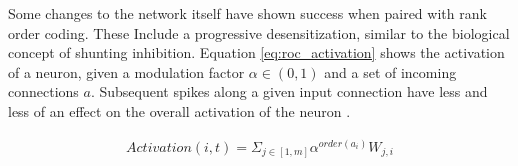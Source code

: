     Some changes to the network itself have shown success when paired with rank
    order coding. These Include a progressive desensitization, similar to the
    biological concept of shunting inhibition. Equation \ref{eq:roc_activation}
    shows the activation of a neuron, given a modulation factor $\alpha \in
    (0,1)$ and a set of incoming connections $a$. Subsequent spikes along a
    given input connection have less and less of an effect on the overall
    activation of the neuron \cite{delorme_2001}.
    
    \begin{align}
        Activation(i,t) = \Sigma_{j \in [1,m]}\alpha^{order(a_i)}W_{j,i} \label{eq:roc_activation}
    \end{align}
    
    
    
